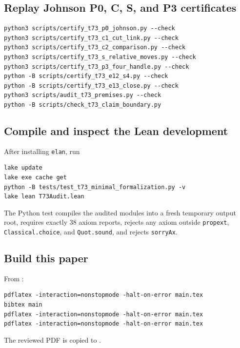 \subsection{Replay Johnson P0, C, S, and P3 certificates}

\begin{verbatim}
python3 scripts/certify_t73_p0_johnson.py --check
python3 scripts/certify_t73_c1_cut_link.py --check
python3 scripts/certify_t73_c2_comparison.py --check
python3 scripts/certify_t73_s_relative_moves.py --check
python3 scripts/certify_t73_p3_four_handle.py --check
python -B scripts/certify_t73_e12_s4.py --check
python -B scripts/certify_t73_e13_close.py --check
python3 scripts/audit_t73_premises.py --check
python -B scripts/check_t73_claim_boundary.py
\end{verbatim}

\subsection{Compile and inspect the Lean development}

After installing \texttt{elan}, run
\begin{verbatim}
lake update
lake exe cache get
python -B tests/test_t73_minimal_formalization.py -v
lake lean T73Audit.lean
\end{verbatim}
The Python test compiles the audited modules into a fresh temporary output
root, requires exactly $38$ axiom reports, rejects any axiom outside
\texttt{propext}, \texttt{Classical.choice}, and \texttt{Quot.sound}, and
rejects \texttt{sorryAx}.

\subsection{Build this paper}

From :
\begin{verbatim}
pdflatex -interaction=nonstopmode -halt-on-error main.tex
bibtex main
pdflatex -interaction=nonstopmode -halt-on-error main.tex
pdflatex -interaction=nonstopmode -halt-on-error main.tex
\end{verbatim}
The reviewed PDF is copied to
.
